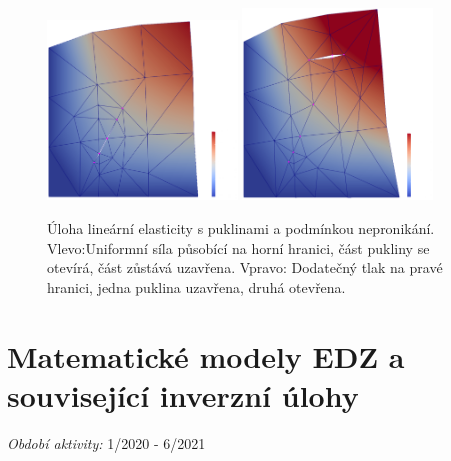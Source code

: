 \documentclass[11pt,a4paper]{article}
\newcommand{\sy}[1]{{\color{blue} SS: #1}}
\begin{document}
\begin{onehalfspacing}
\begin{figure}[ht]
    \centering
    \includegraphics[width=0.45\textwidth]{graphics/ugn_permon_pull2.png}
    \includegraphics[width=0.45\textwidth]{graphics/ugn_permon_pullpush.png}
    \caption{Úloha lineární elasticity s puklinami a podmínkou nepronikání. Vlevo:Uniformní síla působící na horní hranici, část pukliny se otevírá, část zůstává uzavřena. Vpravo: Dodatečný tlak na pravé hranici, jedna puklina uzavřena, druhá otevřena.
}
    \label{fig:ugn_pull}
\end{figure}


\section{ Matematické modely EDZ a související inverzní úlohy}
\label{sec:hm_modely}
 {\it Období aktivity:}  1/2020 - 6/2021

\end{onehalfspacing}
\end{document}
